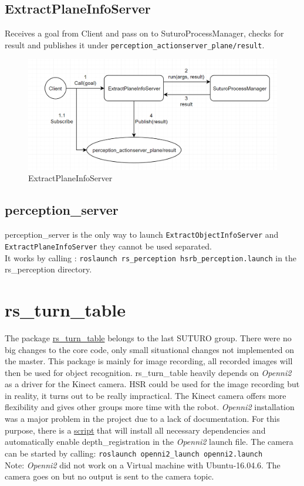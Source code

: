 \documentclass[main.tex]{subfiles}
\begin{document}
			\subsection{ExtractPlaneInfoServer}
Receives a goal from Client and pass on to SuturoProcessManager, checks for result and publishes it under \texttt{perception\_actionserver\_plane/result}.
			\begin{figure}[H]
   			 \centering
    			 \includegraphics[width=1\textwidth]{pictures/perception/suturo_ExtractPlaneInfoServer.png}
   			 \caption{ExtractPlaneInfoServer}
  			\end{figure}

			\subsection{perception\_server}
perception\_server is the only way to launch \texttt{ExtractObjectInfoServer} and \texttt{ExtractPlaneInfoServer} they cannot be used separated. \\
It works by calling : \texttt{roslaunch rs\_perception hsrb\_perception.launch} in the rs\_perception directory.

		\section{rs\_turn\_table}
The package \href{https://github.com/Vanessa-rin/rs_turn_table}{rs\_turn\_table} belongs to the last SUTURO group. There were no big changes to the core code, only small situational changes not implemented on the master. 
This package is mainly for image recording, all recorded images will then be used for object recognition.  
rs\_turn\_table heavily depends on \textit{Openni2} as a driver for the Kinect camera. HSR could be used for the image recording but in reality, it turns out to be really impractical. 
The Kinect camera offers more flexibility and gives other groups more time with the robot. \textit{Openni2} installation was a major problem in the project due to a lack of documentation. For this purpose, there is a 
\href{https://github.com/SUTURO/suturo_perception/blob/Openni2/Openni2/Openni2_Install}{script} that will install all necessary dependencies and automatically enable depth\_registration in the \textit{Openni2} launch file. The camera can be started by calling: \texttt{roslaunch openni2\_launch openni2.launch}
 \\ Note: \textit{Openni2} did not work on a Virtual machine with Ubuntu-16.04.6. The camera goes on but no output is sent to the camera topic. 
\end{document}
